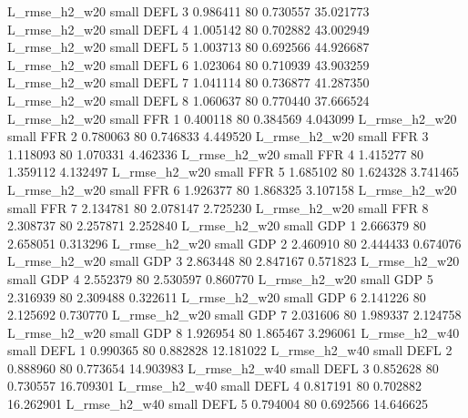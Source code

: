  L_rmse_h2_w20      small     DEFL                 3 0.986411 80       0.730557          35.021773
 L_rmse_h2_w20      small     DEFL                 4 1.005142 80       0.702882          43.002949
 L_rmse_h2_w20      small     DEFL                 5 1.003713 80       0.692566          44.926687
 L_rmse_h2_w20      small     DEFL                 6 1.023064 80       0.710939          43.903259
 L_rmse_h2_w20      small     DEFL                 7 1.041114 80       0.736877          41.287350
 L_rmse_h2_w20      small     DEFL                 8 1.060637 80       0.770440          37.666524
 L_rmse_h2_w20      small      FFR                 1 0.400118 80       0.384569           4.043099
 L_rmse_h2_w20      small      FFR                 2 0.780063 80       0.746833           4.449520
 L_rmse_h2_w20      small      FFR                 3 1.118093 80       1.070331           4.462336
 L_rmse_h2_w20      small      FFR                 4 1.415277 80       1.359112           4.132497
 L_rmse_h2_w20      small      FFR                 5 1.685102 80       1.624328           3.741465
 L_rmse_h2_w20      small      FFR                 6 1.926377 80       1.868325           3.107158
 L_rmse_h2_w20      small      FFR                 7 2.134781 80       2.078147           2.725230
 L_rmse_h2_w20      small      FFR                 8 2.308737 80       2.257871           2.252840
 L_rmse_h2_w20      small      GDP                 1 2.666379 80       2.658051           0.313296
 L_rmse_h2_w20      small      GDP                 2 2.460910 80       2.444433           0.674076
 L_rmse_h2_w20      small      GDP                 3 2.863448 80       2.847167           0.571823
 L_rmse_h2_w20      small      GDP                 4 2.552379 80       2.530597           0.860770
 L_rmse_h2_w20      small      GDP                 5 2.316939 80       2.309488           0.322611
 L_rmse_h2_w20      small      GDP                 6 2.141226 80       2.125692           0.730770
 L_rmse_h2_w20      small      GDP                 7 2.031606 80       1.989337           2.124758
 L_rmse_h2_w20      small      GDP                 8 1.926954 80       1.865467           3.296061
 L_rmse_h2_w40      small     DEFL                 1 0.990365 80       0.882828          12.181022
 L_rmse_h2_w40      small     DEFL                 2 0.888960 80       0.773654          14.903983
 L_rmse_h2_w40      small     DEFL                 3 0.852628 80       0.730557          16.709301
 L_rmse_h2_w40      small     DEFL                 4 0.817191 80       0.702882          16.262901
 L_rmse_h2_w40      small     DEFL                 5 0.794004 80       0.692566          14.646625
